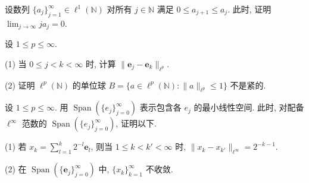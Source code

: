 \begin{exercise}\label{exer:1.28}
设数列 $\{a_{j}\}_{j=1}^{\infty} \in \ell^{1}(\mathbb{N})$ 对所有 $j \in \mathbb{N}$ 满足 $0 \leq a_{j+1} \leq a_{j}$. 此时, 证明 $\lim_{j\to\infty}ja_{j} = 0$.
\end{exercise}

\begin{exercise}\label{exer:1.29}
设 $1 \leq p \leq \infty$.

(1) 当 $0 \leq j < k < \infty$ 时, 计算 $\|\mathbf{e}_{j} - \mathbf{e}_{k}\|_{\ell^{p}}$.

(2) 证明 $\ell^{p}(\mathbb{N})$ 的单位球 $B = \{a \in \ell^{p}(\mathbb{N}) : \|a\|_{\ell^{p}} \leq 1\}$ 不是紧的.
\end{exercise}

\begin{exercise}\label{exer:1.30}
设 $1 \leq p \leq \infty$. 用 $\operatorname{Span}(\{e_{j}\}_{j=0}^{\infty})$ 表示包含各 $e_{j}$ 的最小线性空间. 此时, 对配备 $\ell^{\infty}$ 范数的 $\operatorname{Span}(\{e_{j}\}_{j=0}^{\infty})$, 证明以下.

(1) 若 $x_{k} = \sum_{l=1}^{k}2^{-l}\mathbf{e}_{l}$, 则当 $1 \leq k < k' < \infty$ 时, $\|x_{k} - x_{k'}\|_{\ell^{\infty}} = 2^{-k-1}$.

(2) 在 $\operatorname{Span}(\{\mathbf{e}_{j}\}_{j=0}^{\infty})$ 中, $\{x_{k}\}_{k=1}^{\infty}$ 不收敛.
\end{exercise}

